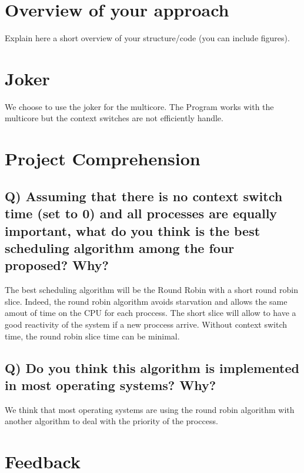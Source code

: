 \documentclass[a4paper, 10pt]{article}
\begin{document}
\section*{Overview of your approach}

Explain here a short overview of your structure/code (you can include figures).

\section*{Joker}

We choose to use the joker for the multicore. The Program works with the multicore but the context switches are not efficiently handle.


\section*{Project Comprehension}

\subsection*{Q) Assuming that there is no context switch time (set to 0) and all processes are equally important, what do you think is the best scheduling algorithm among the four proposed? Why?}\vspace{0.5cm}

The best scheduling algorithm will be the Round Robin with a short round robin slice. 
Indeed, the round robin algorithm avoids starvation and allows the same amout of time
on the CPU for each proccess. The short slice will allow to have a good reactivity 
of the system if a new proccess arrive. Without context switch time, the round robin slice 
time can be minimal. 

\subsection*{Q) Do you think this algorithm is implemented in most operating systems? Why?}\vspace{0.5cm}

We think that most operating systems are using the round robin algorithm with 
another algorithm to deal with the priority of the proccess. 

\section*{Feedback}
\end{document}
